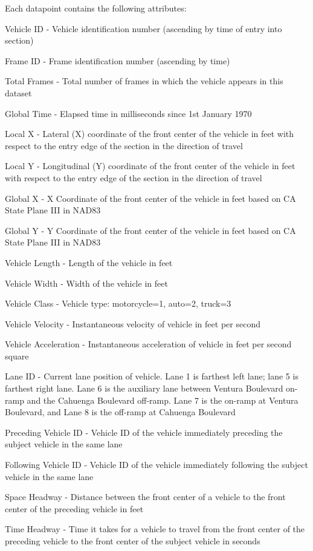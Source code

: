 \documentclass{article}
\begin{document}
Each datapoint contains the following attributes: \\
\begin{description}
    \item Vehicle ID - Vehicle identification number (ascending by time of entry into section)
    \item Frame ID - Frame identification number (ascending by time)
    \item Total Frames - Total number of frames in which the vehicle appears in this dataset
    \item Global Time - Elapsed time in milliseconds since 1st January 1970
    \item Local X - Lateral (X) coordinate of the front center of the vehicle in feet with respect to the entry edge of the section in the direction of travel
    \item Local Y - Longitudinal (Y) coordinate of the front center of the vehicle in feet with respect to the entry edge of the section in the direction of travel
    \item Global X - X Coordinate of the front center of the vehicle in feet based on CA State Plane III in NAD83
    \item Global Y - Y Coordinate of the front center of the vehicle in feet based on CA State Plane III in NAD83
    \item Vehicle Length - Length of the vehicle in feet
    \item Vehicle Width - Width of the vehicle in feet
    \item Vehicle Class - Vehicle type: motorcycle=1, auto=2, truck=3
    \item Vehicle Velocity - Instantaneous velocity of vehicle in feet per second
    \item Vehicle Acceleration - Instantaneous acceleration of vehicle in feet per second square
    \item Lane ID - Current lane position of vehicle. Lane 1 is farthest left lane; lane 5 is farthest right lane. Lane 6 is the auxiliary lane between Ventura Boulevard on-ramp and the Cahuenga Boulevard off-ramp. Lane 7 is the on-ramp at Ventura Boulevard, and Lane 8 is the off-ramp at Cahuenga Boulevard
    \item Preceding Vehicle ID - Vehicle ID of the vehicle immediately preceding the subject vehicle in the same lane
    \item Following Vehicle ID - Vehicle ID of the vehicle immediately following the subject vehicle in the same lane
    \item Space Headway - Distance between the front center of a vehicle to the front center of the preceding vehicle in feet
    \item Time Headway - Time it takes for a vehicle to travel from the front center of the preceding vehicle to the front center of the subject vehicle in seconds
\end{description}
\end{document}
